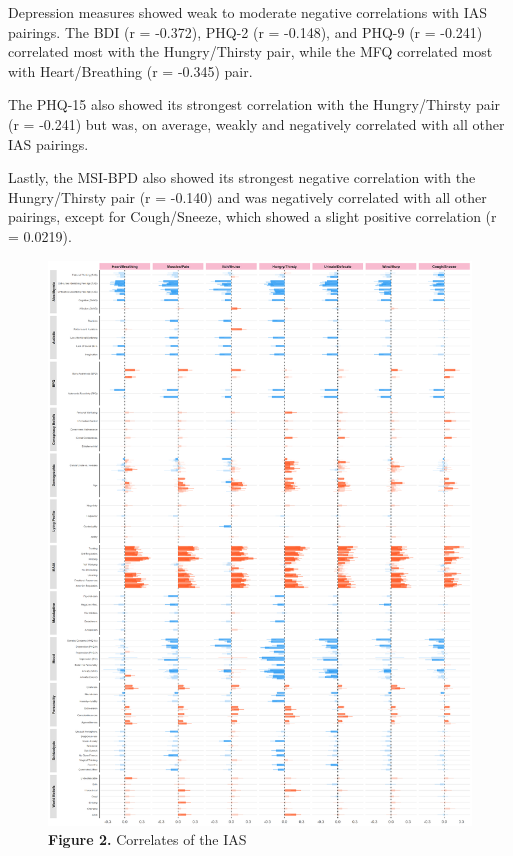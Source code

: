\documentclass[
  man,
  floatsintext,
  longtable,
  nolmodern,
  notxfonts,
  notimes,
  colorlinks=true,linkcolor=blue,citecolor=blue,urlcolor=blue]{apa7}
\begin{document}
Depression measures showed weak to moderate negative correlations with
IAS pairings. The BDI (r = -0.372), PHQ-2 (r = -0.148), and PHQ-9 (r =
-0.241) correlated most with the Hungry/Thirsty pair, while the MFQ
correlated most with Heart/Breathing (r = -0.345) pair.

The PHQ-15 also showed its strongest correlation with the Hungry/Thirsty
pair (r = -0.241) but was, on average, weakly and negatively correlated
with all other IAS pairings.

Lastly, the MSI-BPD also showed its strongest negative correlation with
the Hungry/Thirsty pair (r = -0.140) and was negatively correlated with
all other pairings, except for Cough/Sneeze, which showed a slight
positive correlation (r = 0.0219).

\begin{figure}[H]

\caption{\textbf{Figure 2.} Correlates of the IAS}

{\centering \includegraphics[width=9.48958in,height=\textheight]{figures/clipboard-1619164537.png}

}

\end{figure}%
\end{document}
